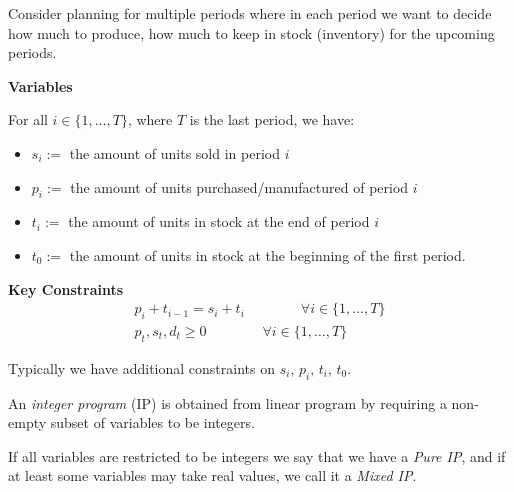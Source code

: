\begin{exbox}
    \begin{example}
        Consider planning for multiple periods where in each period we
        want to decide how much to produce, how much to keep in stock
        (inventory) for the upcoming periods.

        \textbf{Variables}

        For all $ i\in \{1,\ldots,T\} $, where $ T $ is the last period, we have:
        \begin{itemize}
            \item $ s_i:= $ the amount of units sold in period $ i $
            \item $ p_i:= $ the amount of units purchased/manufactured of period $ i $
            \item $ t_i:= $ the amount of units in stock at the end of period $ i $
            \item $ t_0:= $ the amount of units in stock at the beginning of the first period.
        \end{itemize}
        \textbf{Key Constraints}
        \begin{align*}
            p_i+t_{i-1}=s_{i}+t_i \qquad\qquad \forall i\in \{1,\dots,T\} \\
            p_t,s_t,d_t\geqslant  0 \qquad\qquad \forall i\in \{1,\dots,T\}
        \end{align*}
    \end{example}
\end{exbox}

\begin{remark}
    Typically we have additional constraints on $s_i,\,p_i,\,t_i,\,t_0$.
\end{remark}

\begin{defbox}
    \begin{definition}
        An \emph{integer program} (IP) is obtained from linear program
        by requiring a non-empty subset of variables to be integers.
    \end{definition}
\end{defbox}

\begin{remark}
    If all variables are restricted to be integers we say that we
    have a \emph{Pure IP}, and if at least some variables may take
    real values, we call it a \emph{Mixed IP}.
\end{remark}
